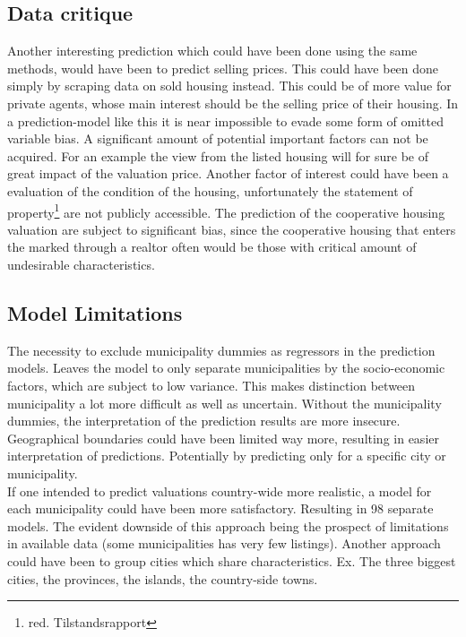 \documentclass[12pt,a4paper]{article}
\begin{document}
\subsection{Data critique}
Another interesting prediction which could have been done using the same methods, would have been to predict selling prices. This could have been done simply by scraping data on sold housing instead. This could be of more value for private agents, whose main interest should be the selling price of their housing. %
\newline 
In a prediction-model like this it is near impossible to evade some form of omitted variable bias. A significant amount of potential important factors can not be acquired. For an example the view from the listed housing will for sure be of great impact of the valuation price. Another factor of interest could have been a evaluation of the condition of the housing, unfortunately the statement of property\footnote{red. Tilstandsrapport} are not publicly accessible. \newline
The prediction of the cooperative housing valuation %
are subject to significant bias, since the cooperative housing that enters the marked through a realtor often would be those with critical amount of undesirable characteristics. 

\subsection{Model Limitations}
The necessity to exclude municipality dummies as regressors in the prediction models. Leaves the model to only separate municipalities by the socio-economic factors, which are subject to low variance. This makes distinction between municipality a lot more difficult as well as uncertain.   
Without the municipality dummies, the interpretation of the prediction results are more insecure. %
Geographical boundaries could have been limited way more, resulting in easier interpretation of predictions. Potentially by predicting only for a specific city or municipality. \\
If one intended to predict valuations country-wide more realistic, a model for each municipality could have been more satisfactory. Resulting in 98 separate models. The evident downside of this approach being the prospect of limitations in available data (some municipalities has very few listings).     
Another approach could have been to group cities which share characteristics. Ex. The three biggest cities, the provinces, the islands, the country-side towns.    
\end{document}
